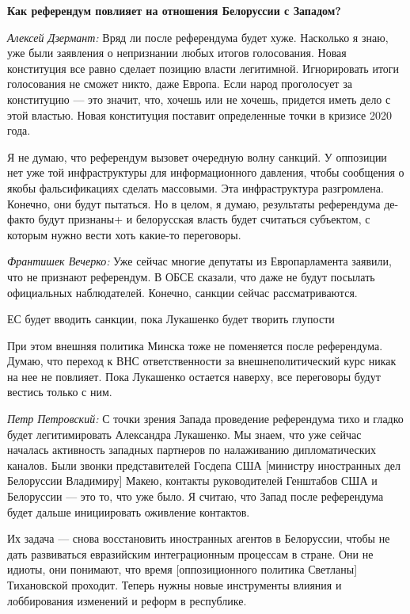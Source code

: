 \textbf{Как референдум повлияет на отношения Белоруссии с Западом?}

\textit{Алексей Дзермант:} Вряд ли после референдума будет хуже. Насколько я знаю, уже были заявления о непризнании любых итогов голосования. Новая конституция все равно сделает позицию власти легитимной. Игнорировать итоги голосования не сможет никто, даже Европа. Если народ проголосует за конституцию — это значит, что, хочешь или не хочешь, придется иметь дело с этой властью. Новая конституция поставит определенные точки в кризисе 2020 года.

Я не думаю, что референдум вызовет очередную волну санкций. У оппозиции нет уже той инфраструктуры для информационного давления, чтобы сообщения о якобы фальсификациях сделать массовыми. Эта инфраструктура разгромлена. Конечно, они будут пытаться. Но в целом, я думаю, результаты референдума де-факто будут признаны+ и белорусская власть будет считаться субъектом, с которым нужно вести хоть какие-то переговоры.

\textit{Франтишек Вечерко:} Уже сейчас многие депутаты из Европарламента заявили, что не признают референдум. В ОБСЕ сказали, что даже не будут посылать официальных наблюдателей. Конечно, санкции сейчас рассматриваются.

\begin{fancyquotes}
    ЕС будет вводить санкции, пока Лукашенко будет творить глупости
\end{fancyquotes}

При этом внешняя политика Минска тоже не поменяется после референдума. Думаю, что переход к ВНС ответственности за внешнеполитический курс никак на нее не повлияет. Пока Лукашенко остается наверху, все переговоры будут вестись только с ним.

\textit{Петр Петровский:} С точки зрения Запада проведение референдума тихо и гладко будет легитимировать Александра Лукашенко. Мы знаем, что уже сейчас началась активность западных партнеров по налаживанию дипломатических каналов. Были звонки представителей Госдепа США [министру иностранных дел Белоруссии Владимиру] Макею, контакты руководителей Генштабов США и Белоруссии — это то, что уже было. Я считаю, что Запад после референдума будет дальше инициировать оживление контактов.

Их задача — снова восстановить иностранных агентов в Белоруссии, чтобы не дать развиваться евразийским интеграционным процессам в стране. Они не идиоты, они понимают, что время [оппозиционного политика Светланы] Тихановской проходит. Теперь нужны новые инструменты влияния и лоббирования изменений и реформ в республике.

